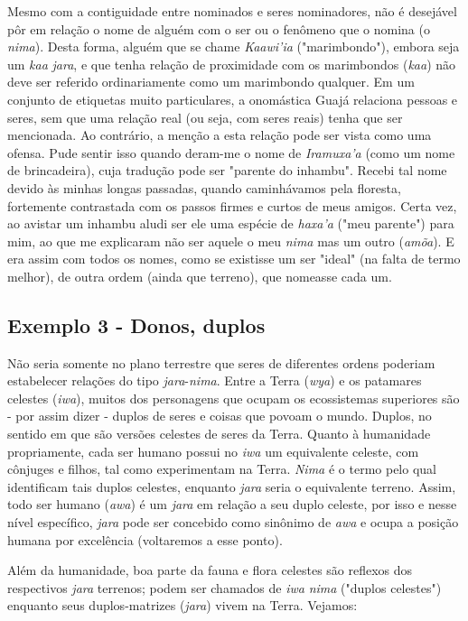 Mesmo com a contiguidade entre nominados e seres nominadores, não é
desejável pôr em relação o nome de alguém com o ser ou o fenômeno que o
nomina (o \emph{nima}). Desta forma, alguém que se chame \emph{Kaawi'ia}
("marimbondo"), embora seja um \emph{kaa} \emph{jara}, e que tenha
relação de proximidade com os marimbondos (\emph{kaa}) não deve ser
referido ordinariamente como um marimbondo qualquer. Em um conjunto de
etiquetas muito particulares, a onomástica Guajá relaciona pessoas e
seres, sem que uma relação real (ou seja, com seres reais) tenha que ser
mencionada. Ao contrário, a menção a esta relação pode ser vista como
uma ofensa. Pude sentir isso quando deram-me o nome de \emph{Iramuxa'a}
(como um nome de brincadeira), cuja tradução pode ser "parente do
inhambu". Recebi tal nome devido às minhas longas passadas, quando
caminhávamos pela floresta, fortemente contrastada com os passos firmes
e curtos de meus amigos. Certa vez, ao avistar um inhambu aludi ser ele
uma espécie de \emph{haxa'a} ("meu parente") para mim, ao que me
explicaram não ser aquele o meu \emph{nima} mas um outro (\emph{amõa}).
E era assim com todos os nomes, como se existisse um ser "ideal" (na
falta de termo melhor), de outra ordem (ainda que terreno), que nomeasse
cada um.

\subsection{Exemplo 3 - Donos, duplos}

Não seria somente no plano terrestre que seres de diferentes ordens
poderiam estabelecer relações do tipo \emph{jara}-\emph{nima}. Entre a
Terra (\emph{wya}) e os patamares celestes (\emph{iwa}), muitos dos
personagens que ocupam os ecossistemas superiores são - por assim dizer
- duplos de seres e coisas que povoam o mundo. Duplos, no sentido em que
são versões celestes de seres da Terra. Quanto à humanidade
propriamente, cada ser humano possui no \emph{iwa} um equivalente
celeste, com cônjuges e filhos, tal como experimentam na Terra.
\emph{Nima} é o termo pelo qual identificam tais duplos celestes,
enquanto \emph{jara} seria o equivalente terreno. Assim, todo ser humano
(\emph{awa}) é um \emph{jara} em relação a seu duplo celeste, por isso e
nesse nível específico, \emph{jara} pode ser concebido como sinônimo de
\emph{awa} e ocupa a posição humana por excelência (voltaremos a esse
ponto).

Além da humanidade, boa parte da fauna e flora celestes são reflexos dos
respectivos \emph{jara} terrenos; podem ser chamados de \emph{iwa}
\emph{nima} ("duplos celestes") enquanto seus duplos-matrizes
(\emph{jara}) vivem na Terra. Vejamos:

